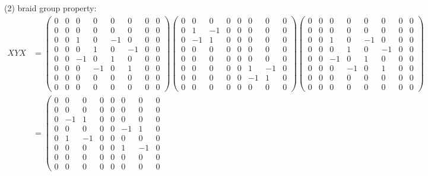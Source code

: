 \documentclass{article}
\begin{document}
(2) braid group property:
 \begin{align}
    XYX&=
    \left(\begin{smallmatrix}
    0 & 0 & 0 & 0 & 0 & 0 & 0 & 0\\0 & 0 & 0 & 0 & 0 & 0 & 0 & 0\\0 & 0 & 1 & 0 & -1 & 0 & 0 & 0\\0 & 0 & 0 & 1 & 0 & -1 & 0 & 0\\0 & 0 & -1 & 0 & 1 & 0 & 0 & 0\\0 & 0 & 0 & -1 & 0 & 1 & 0 & 0\\0 & 0 & 0 & 0 & 0 & 0 & 0 & 0\\0 & 0 & 0 & 0 & 0 & 0 & 0 & 0
    \end{smallmatrix}\right)
    \left(\begin{smallmatrix}
    0 & 0 & 0 & 0 & 0 & 0 & 0 & 0\\0 & 1 & -1 & 0 & 0 & 0 & 0 & 0\\0 & -1 & 1 & 0 & 0 & 0 & 0 & 0\\0 & 0 & 0 & 0 & 0 & 0 & 0 & 0\\0 & 0 & 0 & 0 & 0 & 0 & 0 & 0\\0 & 0 & 0 & 0 & 0 & 1 & -1 & 0\\0 & 0 & 0 & 0 & 0 & -1 & 1 & 0\\0 & 0 & 0 & 0 & 0 & 0 & 0 & 0
    \end{smallmatrix}\right)
    \left(\begin{smallmatrix}
    0 & 0 & 0 & 0 & 0 & 0 & 0 & 0\\0 & 0 & 0 & 0 & 0 & 0 & 0 & 0\\0 & 0 & 1 & 0 & -1 & 0 & 0 & 0\\0 & 0 & 0 & 1 & 0 & -1 & 0 & 0\\0 & 0 & -1 & 0 & 1 & 0 & 0 & 0\\0 & 0 & 0 & -1 & 0 & 1 & 0 & 0\\0 & 0 & 0 & 0 & 0 & 0 & 0 & 0\\0 & 0 & 0 & 0 & 0 & 0 & 0 & 0
    \end{smallmatrix}\right)\\[0.2cm]
    &=\left(\begin{smallmatrix}
    0 & 0 & 0 & 0 & 0 & 0 & 0 & 0\\0 & 0 & 0 & 0 & 0 & 0 & 0 & 0\\0 & -1 & 1 & 0 & 0 & 0 & 0 & 0\\0 & 0 & 0 & 0 & 0 & -1 & 1 & 0\\0 & 1 & -1 & 0 & 0 & 0 & 0 & 0\\0 & 0 & 0 & 0 & 0 & 1 & -1 & 0\\0 & 0 & 0 & 0 & 0 & 0 & 0 & 0\\0 & 0 & 0 & 0 & 0 & 0 & 0 & 0

\end{smallmatrix}
\end{align}
\end{document}
